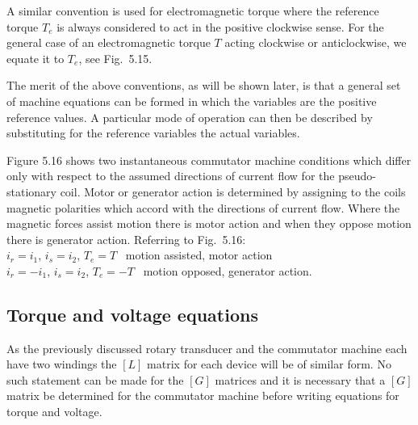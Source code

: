 \documentclass[a4paper,numbers=noenddot,12pt]{scrbook}
\begin{document}
        A similar convention is used for electromagnetic torque where the reference torque $T_e$ is always considered to act in the positive clockwise sense. For the general case of an electromagnetic torque $T$ acting clockwise or anticlockwise, we equate it to $T_e$, see Fig.\ 5.15.

        The merit of the above conventions, as will be shown later, is that a general set of machine equations can be formed in which the variables are the positive reference values. A particular mode of operation can then be described by substituting for the reference variables the actual variables.

        Figure 5.16 shows two instantaneous commutator machine conditions which differ only with respect to the assumed directions of current flow for the pseudo-stationary coil. Motor or generator action is determined by assigning to the coils magnetic polarities which accord with the directions of current flow. Where the magnetic forces assist motion there is motor action and when they oppose motion there is generator action. Referring to Fig.\ 5.16:\\
        \TabPositions{0cm,2cm,4cm,6cm}
        $i_r = i_1$, \tab$i_s = i_2$, \tab$T_e = T$ \tab\ motion assisted, motor action \\
        $i_r = - i_1$, \tab$i_s = i_2$, \tab$T_e = - T$ \tab\ motion opposed, generator action.

        \subsection{Torque and voltage equations}
        As the previously discussed rotary transducer and the commutator machine each have two windings the $[L]$ matrix for each device will be of similar form. No such statement can be made for the $[G]$ matrices and it is necessary that a $[G]$ matrix be determined for the commutator machine before writing equations for torque and voltage.
\end{document}
